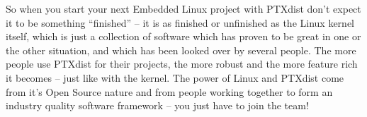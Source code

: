 So when you start your next Embedded Linux project with PTXdist don't
expect it to be something "`finished"' -- it is as finished or
unfinished as the Linux kernel itself, which is just a collection of
software which has proven to be great in one or the other situation, and
which has been looked over by several people. The more people use
PTXdist for their projects, the more robust and the more feature rich it
becomes -- just like with the kernel. The power of Linux and PTXdist
come from it's Open Source nature and from people working together to
form an industry quality software framework -- you just have to join the
team!

